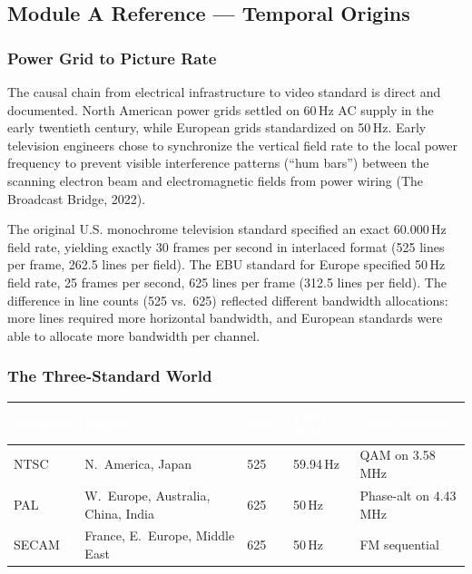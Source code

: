 \documentclass[11pt,letterpaper]{article}
\newcommand{\tableheader}[1]{\textbf{\sffamily\textcolor{white}{#1}}}
\begin{document}
\subsection{Module A Reference --- Temporal Origins}

\subsubsection{Power Grid to Picture Rate}

The causal chain from electrical infrastructure to video standard is direct and documented. North
American power grids settled on 60\,Hz AC supply in the early twentieth century, while European grids
standardized on 50\,Hz. Early television engineers chose to synchronize the vertical field rate to
the local power frequency to prevent visible interference patterns (``hum bars'') between the scanning
electron beam and electromagnetic fields from power wiring (The Broadcast Bridge, 2022).

The original U.S. monochrome television standard specified an exact 60.000\,Hz field rate, yielding
exactly 30 frames per second in interlaced format (525 lines per frame, 262.5 lines per field). The
EBU standard for Europe specified 50\,Hz field rate, 25 frames per second, 625 lines per frame
(312.5 lines per field). The difference in line counts (525 vs.\ 625) reflected different bandwidth
allocations: more lines required more horizontal bandwidth, and European standards were able to
allocate more bandwidth per channel.

\subsubsection{The Three-Standard World}

\begin{center}
\begin{tabularx}{\textwidth}{L{2cm}L{3cm}C{2cm}C{2cm}C{2.5cm}}
\toprule
{}
\tableheader{Standard} & \tableheader{Regions} & \tableheader{Lines} & \tableheader{Field Rate} & \tableheader{Color System} \\
\midrule
NTSC & N.\ America, Japan & 525 & 59.94\,Hz & QAM on 3.58\,MHz \\
PAL  & W.\ Europe, Australia, China, India & 625 & 50\,Hz & Phase-alt on 4.43\,MHz \\
SECAM & France, E.\ Europe, Middle East & 625 & 50\,Hz & FM sequential \\
\bottomrule
\end{tabularx}
\end{center}
\end{document}

